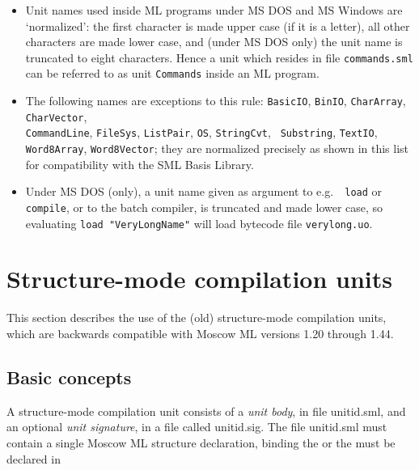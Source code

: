 \documentclass[fleqn]{article}
\begin{document}
\begin{itemize}
\item Unit names used inside ML programs under MS DOS and MS Windows
  are `normalized': the first character is made upper case (if it is a
  letter), all other characters are made lower case, and (under MS DOS
  only) the unit name is truncated to eight characters.  Hence a unit
  which resides in file {\tt commands.sml} can be referred to as unit
  {\tt Commands} inside an ML program.
  
\item The following names are exceptions to this rule: {\tt BasicIO},
  {\tt BinIO}, {\tt CharArray}, {\tt CharVector},\\ {\tt CommandLine},
  {\tt FileSys}, {\tt ListPair}, {\tt OS}, {\tt StringCvt}, {\tt
    Substring}, {\tt TextIO}, {\tt Word8Array}, {\tt Word8Vector};
  they are normalized precisely as shown in this list for
  compatibility with the SML Basis Library.

  
\item Under MS DOS (only), a unit name given as argument to e.g.\ {\tt
    load} or {\tt compile}, or to the batch compiler, is truncated and
  made lower case, so evaluating {\tt load "VeryLongName"} will load
  bytecode file {\tt verylong.uo}.
\end{itemize}


\newpage
\section{Structure-mode compilation units}
\label{sec-structure-mode}

This section describes the use of the (old) structure-mode compilation
units, which are backwards compatible with Moscow ML versions 1.20
through 1.44.


\subsection{Basic concepts}

A structure-mode compilation unit consists of a {\em unit body}, in
file unitid.sml, and an optional {\em unit signature}, in a file called
unitid.sig\@.  The file unitid.sml must contain a single Moscow ML structure
declaration, binding the or the must be declared in
\end{document}
